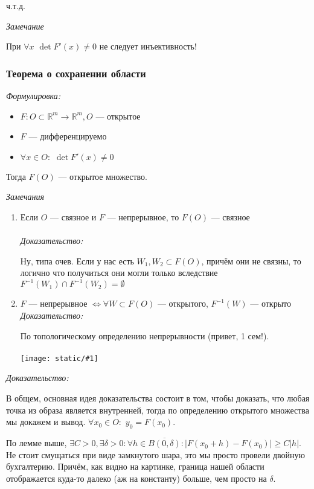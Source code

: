\documentclass{article}
\def\dbl{\,\,}
\def\image#1{\texttt{[image: static/\#1]}}
\begin{document}
ч.т.д.

\textit{Замечание}

При $\forall x \dbl \det F'(x) \neq 0$ не следует инъективность!

\subsubsection{Теорема о сохранении области}

\textit{Формулировка:}
\begin{itemize}
    \item $F: O \subset \mathbb{R}^m \rightarrow \mathbb{R}^m, O$ --- открытое
    \item $F$ --- дифференцируемо
    \item $\forall x \in O: \dbl \det F'(x) \neq 0$
\end{itemize}

Тогда $F(O)$ --- открытое множество.

\textit{Замечания}
\begin{enumerate}
    \item Если $O$ --- связное и $F$ --- непрерывное, то $F(O)$ --- связное\\\\
    \textit{Доказательство:}

    Ну, типа очев. Если у нас есть $W_1, W_2 \subset F(O)$, причём они не связны, то логично что получиться они могли только вследствие $F^{-1}(W_1) \cap F^{-1}(W_2) = \emptyset$
    \item $F$ --- непрерывное $\Leftrightarrow \forall W \subset F(O)$ --- открытого, $F^{-1}(W)$ --- открыто
    \textit{Доказательство:}

    По топологическому определению непрерывности (привет, 1 сем!).\\\\
    \image{sohr_obl_1.png}
\end{enumerate}


\textit{Доказательство:}

В общем, основная идея доказательства состоит в том, чтобы доказать, что любая точка из образа является внутренней, тогда по определению открытого множества мы докажем и вывод.
$\forall x_0 \in O: \dbl y_0 = F(x_0)$. 

По лемме выше, $\exists C > 0, \exists \delta > 0: \forall h \in \overline{B(0, \delta)}: |F(x_0 + h) - F(x_0)| \ge C|h|$. Не стоит смущаться при виде замкнутого шара, это мы просто провели двойную бухгалтерию. Причём, как видно на картинке, граница нашей области отображается куда-то далеко (аж на константу) больше, чем просто на $\delta$.
\end{document}
